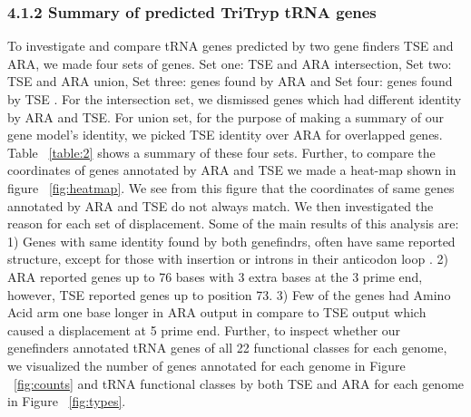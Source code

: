 \documentclass[
12pt, %
a4paper, %
oneside, %
headinclude,footinclude, %
BCOR5mm, %
]{scrartcl}
\begin{document}
\subsubsection*{4.1.2 Summary of predicted TriTryp tRNA genes}
To investigate and compare tRNA genes predicted by two gene finders TSE and ARA, we made four sets of genes. Set one: TSE and ARA intersection, Set two: TSE and ARA union, Set three: genes found by ARA and Set four: genes found by TSE . For the intersection set, we dismissed genes which had different identity by ARA and TSE. For union set, for the purpose of making a summary of our gene model’s identity, we picked TSE identity over ARA for overlapped genes. Table  ~\ref{table:2} shows a summary of these four sets. Further, to compare the coordinates of genes annotated by ARA and TSE we made a heat-map shown in figure ~\ref{fig:heatmap}. We see from this figure that the coordinates of same genes annotated by ARA and TSE do not always match. We then investigated the reason for each set of displacement. Some of the main results of this analysis are:
1) Genes with same identity found by both genefindrs, often have same reported structure, except for those with insertion or  introns in their anticodon loop \cite{PadillaIntron}. 2) ARA reported genes up to 76 bases with 3 extra bases at the 3 prime end, however, TSE reported genes up to position 73. 3) Few of the genes had Amino Acid arm one base longer in ARA output in compare to TSE output which caused a displacement at 5 prime end. Further, to inspect whether our genefinders annotated tRNA genes of all 22 functional classes for each genome, we visualized the number of genes annotated for each genome in Figure ~\ref{fig:counts} and tRNA functional classes by both TSE and ARA for each genome in Figure ~\ref{fig:types}.
\end{document}
